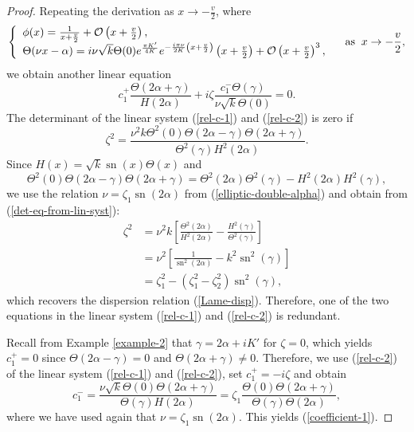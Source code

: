 \documentclass[10pt,a4paper]{amsart}
\DeclareMathOperator{\sn}{sn}
\begin{document}
\begin{proof}
Repeating the derivation as $x \to -\frac{v}{2}$, where 
$$
\left\{ \begin{array}{l} 
\phi(x) = \frac{1}{x + \frac{v}{2}} + \mathcal{O}\left(x + \frac{v}{2}\right), \\
\Theta(\nu x - \alpha) = i \nu \sqrt{k}\Theta(0)  e^{\frac{\pi K'}{4K}} e^{-\frac{i \pi \nu}{2K} \left(x + \frac{v}{2} \right)} \left( x + \frac{v}{2} \right) + \mathcal{O}\left(x + \frac{v}{2} \right)^3, \end{array} \right. \quad \mbox{\rm as} \;\; x \to -\frac{v}{2}, 
$$
we obtain another linear equation 
\begin{equation}
\label{rel-c-2}
c_1^+ \frac{\Theta(2 \alpha + \gamma)}{H(2\alpha)} + i \zeta \frac{c_1^-  \Theta(\gamma)}{\nu \sqrt{k} \Theta(0)} = 0.
\end{equation}
The determinant of the linear system (\ref{rel-c-1}) and (\ref{rel-c-2}) is zero if 
\begin{equation}
\label{det-eq-from-lin-syst}
\zeta^2 = \frac{\nu^2 k \Theta^2(0) \Theta(2\alpha-\gamma) \Theta(2\alpha + \gamma)}{\Theta^2(\gamma) H^2(2\alpha)}.
\end{equation}
Since $H(x) = \sqrt{k} \sn(x) \Theta(x)$ and 
$$
\Theta^2(0) \Theta(2\alpha-\gamma) \Theta(2\alpha+\gamma) = \Theta^2(2\alpha) \Theta^2(\gamma) - H^2(2\alpha) H^2(\gamma), 
$$
we use the relation $\nu = \zeta_1 \sn(2\alpha)$ from (\ref{elliptic-double-alpha}) and obtain from (\ref{det-eq-from-lin-syst}):
\begin{align*}
\zeta^2 &= \nu^2 k \left[ \frac{\Theta^2(2 \alpha)}{H^2(2 \alpha)} - \frac{H^2(\gamma)}{\Theta^2(\gamma)} \right] \\
&= \nu^2 \left[ \frac{1}{\sn^2(2\alpha)} - k^2 \sn^2(\gamma) \right] \\
&= \zeta_1^2 -  (\zeta_1^2 - \zeta_2^2) \sn^2(\gamma),
\end{align*}
which recovers the dispersion relation (\ref{Lame-disp}). Therefore, one 
of the two equations in the linear system (\ref{rel-c-1}) and (\ref{rel-c-2}) is redundant.

Recall from Example \ref{example-2} that $\gamma = 2 \alpha + i K'$ for $\zeta = 0$, which yields $c_1^+ = 0$ since $\Theta(2\alpha - \gamma) = 0$ and $\Theta(2\alpha + \gamma) \neq 0$. Therefore, we use (\ref{rel-c-2}) of the linear system (\ref{rel-c-1}) and (\ref{rel-c-2}), set $c_1^+ = -i\zeta$ and obtain 
$$
c_1^- = \frac{\nu \sqrt{k} \Theta(0) \Theta(2\alpha + \gamma)}{\Theta(\gamma) H(2\alpha)} = \zeta_1 \frac{\Theta(0) \Theta(2\alpha + \gamma)}{\Theta(\gamma) \Theta(2\alpha)},
$$
where we have used again that $\nu = \zeta_1 \sn(2\alpha)$. This yields (\ref{coefficient-1}).


\end{proof}
\end{document}
